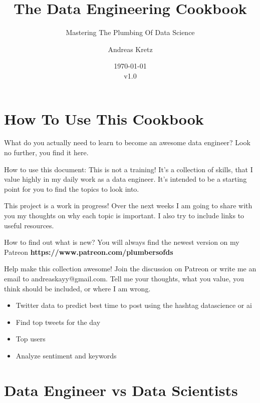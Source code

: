 \documentclass[12pt]{scrartcl} %
\title{The Data Engineering Cookbook}
\subtitle{Mastering The Plumbing Of Data Science}
\author{Andreas Kretz}
\date{\today\\v1.0}
\begin{document}
\maketitle
 

\pagebreak

\setcounter{tocdepth}{3}
\tableofcontents
 
\pagebreak
 
\section{How To Use This Cookbook}
What do you actually need to learn to become an awesome data engineer? 
Look no further, you find it here.

How to use this document: This is not a training! It's a collection of skills, that I value highly in my daily work as a data engineer. It's intended to be a starting point for you to find the topics to look into.

This project is a work in progress!
Over the next weeks I am going to share with you my thoughts on why each topic is important. I also try to include links to useful resources.

How to find out what is new? 
You will always find the newest version on my Patreon \textbf{https://www.patreon.com/plumbersofds}

Help make this collection awesome!
Join the discussion on Patreon or write me an email to andreaskayy@gmail.com. Tell me your thoughts, what you value, you think should be included, or where I am wrong. 

\begin{itemize}
\item Twitter data to predict best time to post using the hashtag datascience or ai
\item Find top tweets for the day
\item Top users
\item Analyze sentiment and keywords
\end{itemize}

\pagebreak

\section{Data Engineer vs Data Scientists}
\end{document}

